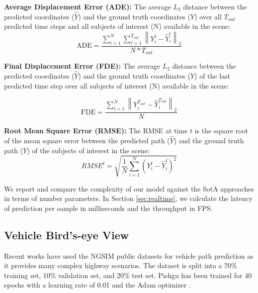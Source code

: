 \documentclass[sigconf]{acmart}
\begin{document}
\textbf{Average Displacement Error (ADE): } The average $L_2$ distance between the predicted coordinates ($\hat{Y}$) and the ground truth coordinates ($Y$) over all $T_{out}$ predicted time steps and all subjects of interest (N) available in the scene:
\begin{equation}
\mathrm{ADE}=\frac{\sum_{i=1}^{N} \sum_{t=1}^{T_{out}}\left\|Y_{i}^{t}-\hat{Y}_{i}^{t}\right\|_{2}}{N * T_{out}}
\end{equation}

\textbf{Final Displacement Error (FDE): } The average $L_2$ distance between the predicted coordinates ($\hat{Y}$) and the ground truth coordinates ($Y$) of the last predicted time step over all subjects of interest (N) available in the scene:

\begin{equation}
\mathrm{FDE}=\frac{\sum_{i=1}^{N}\left\|Y_{i}^{T_{out}}-\hat{Y}_{i}^{T_{out}}\right\|_{2}}{N}
\end{equation}

\textbf{Root Mean Square Error (RMSE):}
The RMSE at time $t$ is the square root of the mean square error between the predicted path ($\hat{Y}$) and the ground truth path ($Y$) of the subjects of interest in the scene:
\begin{equation}
    RMSE^{t}=\sqrt{\frac{1}{N}\sum_{i=1}^{N}{(Y_{i}^{t}-\hat{Y}_{i}^{t})}^{2}}
\end{equation}


We report and compare the complexity of our model against the SotA approaches in terms of number parameters. In Section \ref{sec:realtime}, we calculate the latency of prediction per sample in milliseconds and the throughput in FPS.










\subsection{Vehicle Bird's-eye View}

Recent works \cite{GSTCN2022, aitp2022,dginet2022} have used the NGSIM public datasets for vehicle path prediction as it provides many complex highway scenarios. The dataset is split into a 70\% training set, 10\% validation set, and 20\% test set. Pishgu has been trained for 40 epochs with a learning rate of 0.01 and the Adam optimizer \cite{kingma2014adam}.
\end{document}
